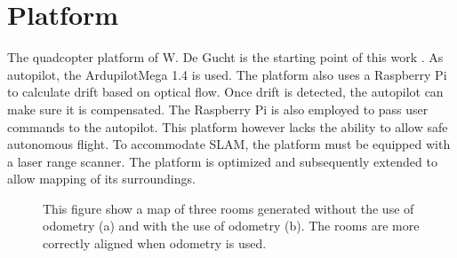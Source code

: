 \documentclass[twocolumn]{phdsymp} %
\begin{document}
\section{Platform}
The quadcopter platform of W. De Gucht is the starting point of this work \cite{thesis:wouter}. As autopilot, the ArdupilotMega 1.4 is used. The platform also uses a Raspberry Pi to calculate drift based on optical flow. Once drift is detected, the autopilot can make sure it is compensated. The Raspberry Pi is also employed to pass user commands to the autopilot. This platform however lacks the ability to allow safe autonomous flight. To accommodate SLAM, the platform must be equipped with a laser range scanner. The platform is optimized and subsequently extended to allow mapping of its surroundings.

\begin{figure}[t]
	\centering
	\hspace{0.1\linewidth}
	\caption{This figure show a map of three rooms generated without the use of odometry (a) and with the use of odometry (b). The rooms are more correctly aligned when odometry is used.} \label{fig:SLAM}
\end{figure}
\end{document}
